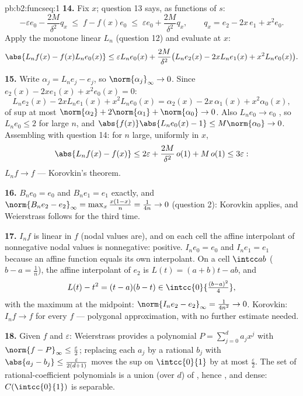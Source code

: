 \begin{solution}{pb:b2:funcseq:1}
\textbf{14.} Fix $x$; question 13 says, as functions of $s$:
\[
-\varepsilon e_0 - \frac{2M}{\delta^2}q_x
\;\leq\; f - f(x)e_0
\;\leq\; \varepsilon e_0 + \frac{2M}{\delta^2}q_x,
\qquad q_x = e_2 - 2x\,e_1 + x^2e_0 .
\]
Apply the monotone linear $L_n$ (question 12) and evaluate at
$x$:
\[
\abs{L_nf(x) - f(x)L_ne_0(x)}
\leq \varepsilon L_ne_0(x)
+ \frac{2M}{\delta^2}\bigl(L_ne_2(x) - 2xL_ne_1(x)
+ x^2L_ne_0(x)\bigr) .
\]

\textbf{15.} Write $\alpha_j = L_ne_j - e_j$, so
$\norm{\alpha_j}_\infty \to 0$. Since $e_2(x) - 2xe_1(x) +
x^2e_0(x) = 0$:
\[
L_ne_2(x) - 2xL_ne_1(x) + x^2L_ne_0(x)
= \alpha_2(x) - 2x\,\alpha_1(x) + x^2\alpha_0(x),
\]
of sup  at most $\norm{\alpha_2} + 2\norm{\alpha_1} +
\norm{\alpha_0} \to 0$. Also $L_ne_0 \to e_0$ , so
$L_ne_0 \leq 2$ for large $n$, and $\abs{f(x)}\abs{L_ne_0(x) -
1} \leq M\norm{\alpha_0} \to 0$. Assembling with question 14:
for $n$ large, uniformly in $x$,
\[
\abs{L_nf(x) - f(x)} \leq 2\varepsilon +
\frac{2M}{\delta^2}\,o(1) + M\,o(1) \leq 3\varepsilon :
\]
$L_nf \to f$  --- Korovkin's theorem.

\textbf{16.} $B_ne_0 = e_0$ and $B_ne_1 = e_1$ exactly, and
$\norm{B_ne_2 - e_2}_\infty = \max_x\frac{x(1-x)}{n} =
\frac{1}{4n} \to 0$ (question 2): Korovkin applies, and
Weierstrass follows for the third time.

\textbf{17.} $I_nf$ is linear in $f$ (nodal values are), and on
each cell the affine interpolant of nonnegative nodal values is
nonnegative: positive. $I_ne_0 = e_0$ and $I_ne_1 = e_1$
because an affine function equals its own interpolant. On a
cell $\intcc ab$ ($b - a = \frac1n$), the affine interpolant of
$e_2$ is $L(t) = (a+b)t - ab$, and
\[
L(t) - t^2 = (t-a)(b-t) \in
\intcc{0}{\tfrac{(b-a)^2}{4}} ,
\]
with the maximum at the midpoint: $\norm{I_ne_2 - e_2}_\infty =
\frac{1}{4n^2} \to 0$. Korovkin: $I_nf \to f$  for
every  $f$ --- polygonal approximation, with no
further estimate needed.

\textbf{18.} Given $f$ and $\varepsilon$: Weierstrass provides
a polynomial $P = \sum_{j=0}^d a_jx^j$ with $\norm{f -
P}_\infty \leq \frac\varepsilon2$; replacing each $a_j$ by a
rational $b_j$ with $\abs{a_j - b_j} \leq
\frac{\varepsilon}{2(d+1)}$ moves the sup  on
$\intcc{0}{1}$ by at most $\frac\varepsilon2$. The set of
rational-coefficient polynomials is a  union (over
$d$) of , hence , and dense:
$C(\intcc{0}{1})$ is separable.


\end{solution}
